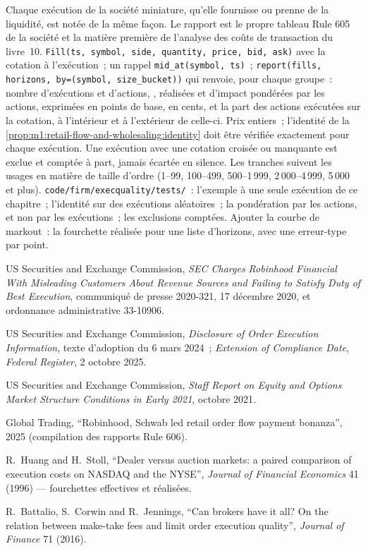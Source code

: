 \begin{build}
 Chaque exécution de la société miniature, qu'elle fournisse
ou prenne de la liquidité, est notée de la même façon. Le rapport est le
propre tableau Rule 605 de la société et la matière première de l'analyse des coûts de
transaction du livre~10.
 \texttt{Fill(ts, symbol, side, quantity, price, bid, ask)}
avec la cotation à l'exécution~; un rappel \texttt{mid\_at(symbol, ts)}~;
\texttt{report(fills, horizons, by=(symbol, size\_bucket))} qui renvoie,
pour chaque groupe~: nombre d'exécutions et d'actions, , réalisées
et d'impact pondérées par les actions, exprimées en points de base,  en cents, et
la part des actions exécutées sur la cotation, à l'intérieur et à l'extérieur de celle-ci.
 Prix entiers~; l'identité de
la \cref{prop:m1:retail-flow-and-wholesaling:identity} doit être vérifiée exactement pour
chaque exécution. Une exécution avec une cotation croisée ou manquante est exclue et comptée
à part, jamais écartée en silence. Les tranches suivent les usages en matière de
taille d'ordre (1--99, 100--499, 500--1\,999, 2\,000--4\,999, 5\,000 et plus).
 \texttt{code/firm/execquality/tests/}~: l'exemple
à une seule exécution de ce chapitre~; l'identité sur des exécutions aléatoires~; la pondération
par les actions, et non par les exécutions~; les exclusions comptées.
 Ajouter la courbe de markout~: la fourchette réalisée pour une
liste d'horizons, avec une erreur-type par point.
\end{build}

\begin{omsources}
\item US Securities and Exchange Commission, \emph{SEC Charges Robinhood
Financial With Misleading Customers About Revenue Sources and Failing to
Satisfy Duty of Best Execution}, communiqué de presse 2020-321, 17 décembre 2020,
et ordonnance administrative 33-10906.
\item US Securities and Exchange Commission, \emph{Disclosure of Order
Execution Information}, texte d'adoption du 6 mars 2024~; \emph{Extension of
Compliance Date}, \emph{Federal Register}, 2 octobre 2025.
\item US Securities and Exchange Commission, \emph{Staff Report on Equity and
Options Market Structure Conditions in Early 2021}, octobre 2021.
\item Global Trading, ``Robinhood, Schwab led retail order flow payment
bonanza'', 2025 (compilation des rapports Rule 606).
\item R.~Huang and H.~Stoll, ``Dealer versus auction markets: a paired
comparison of execution costs on NASDAQ and the NYSE'', \emph{Journal of
Financial Economics} 41 (1996) --- fourchettes effectives et réalisées.
\item R.~Battalio, S.~Corwin and R.~Jennings, ``Can brokers have it all? On
the relation between make-take fees and limit order execution quality'',
\emph{Journal of Finance} 71 (2016).
\end{omsources}

